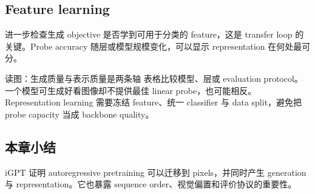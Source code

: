 \subsection{Feature learning}

进一步检查生成 objective 是否学到可用于分类的 feature，这是 transfer loop 的关键。Probe accuracy 随层或模型规模变化，可以显示 representation 在何处最可分。


\begin{knowledgebox}{读图：生成质量与表示质量是两条轴}
表格比较模型、层或 evaluation protocol。一个模型可生成好看图像却不提供最佳 linear probe，也可能相反。Representation learning 需要冻结 feature、统一 classifier 与 data split，避免把 probe capacity 当成 backbone quality。
\end{knowledgebox}

\subsection{本章小结}

iGPT 证明 autoregressive pretraining 可以迁移到 pixels，并同时产生 generation 与 representation。它也暴露 sequence order、视觉偏置和评价协议的重要性。


